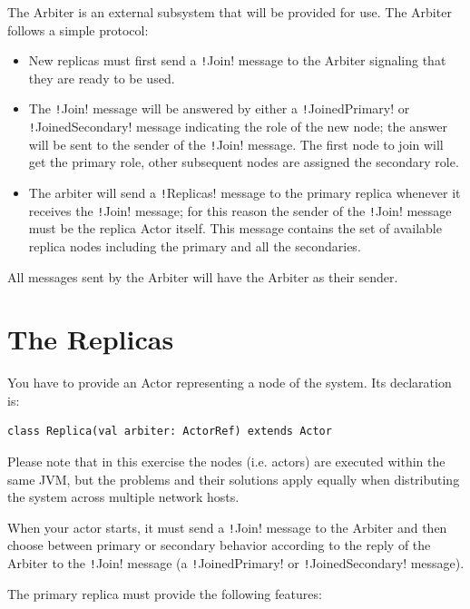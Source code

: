 \documentclass{article}
\begin{document}
The Arbiter is an external subsystem that will be provided for use. The Arbiter follows a simple protocol:

\begin{itemize}
    \item New replicas must first send a \texttt!Join! message to the Arbiter signaling that they are ready to be used.
    \item The \texttt!Join! message will be answered by either a \texttt!JoinedPrimary! or \texttt!JoinedSecondary! message indicating the role of the new node; the answer will be sent to the sender of the \texttt!Join! message. The first node to join will get the primary role, other subsequent nodes are assigned the secondary role.
    \item The arbiter will send a \texttt!Replicas! message to the primary replica whenever it receives the \texttt!Join! message; for this reason the sender of the \texttt!Join! message must be the replica Actor itself. This message contains the set of available replica nodes including the primary and all the secondaries.
\end{itemize}

All messages sent by the Arbiter will have the Arbiter as their sender.

\section{The Replicas}\label{s:replicas}

You have to provide an Actor representing a node of the system. Its declaration is:

\begin{verbatim}
class Replica(val arbiter: ActorRef) extends Actor 
\end{verbatim}

Please note that in this exercise the nodes (i.e. actors) are executed within the same JVM, but the problems and their solutions apply equally when distributing the system across multiple network hosts.

When your actor starts, it must send a \texttt!Join! message to the Arbiter and then choose between primary or secondary behavior according to the reply of the Arbiter to the \texttt!Join! message (a \texttt!JoinedPrimary! or \texttt!JoinedSecondary! message).

The primary replica must provide the following features:
\end{document}

